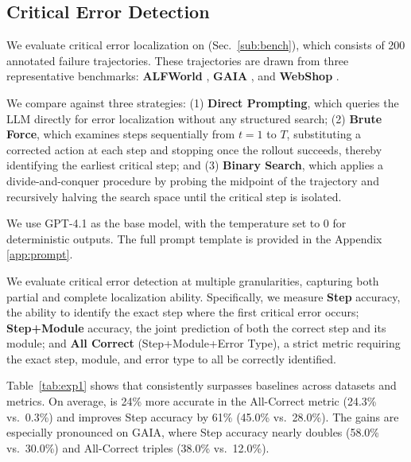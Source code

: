 \subsection{Critical Error Detection}
\label{subsec:rootcause}

We evaluate critical error localization on \Bench{} (Sec.~\ref{sub:bench}), which consists of 200 annotated failure trajectories.  
These trajectories are drawn from three representative benchmarks: \textbf{ALFWorld} \citep{shridhar2020alfworld}, \textbf{GAIA} \citep{mialon2023gaia}, and \textbf{WebShop} \citep{yao2022webshop}.  

We compare against three strategies: (1) \textbf{Direct Prompting}, which queries the LLM directly for error localization without any structured search; (2) \textbf{Brute Force}, which examines steps sequentially from $t{=}1$ to $T$, substituting a corrected action at each step and stopping once the rollout succeeds, thereby identifying the earliest critical step; and (3) \textbf{Binary Search}, which applies a divide-and-conquer procedure by probing the midpoint of the trajectory and recursively halving the search space until the critical step is isolated.  

We use GPT-4.1 as the base model, with the temperature set to 0 for deterministic outputs. The full prompt template is provided in the Appendix \ref{app:prompt}. 

 We evaluate critical error detection at multiple granularities, capturing both partial and complete localization ability. Specifically, we measure \textbf{Step} accuracy, the ability to identify the exact step where the first critical error occurs; %
\textbf{Step+Module} accuracy, the joint prediction of both the correct step and its module; and \textbf{All Correct} (Step+Module+Error Type), a strict metric requiring the exact step, module, and error type to all be correctly identified.


Table~\ref{tab:exp1} shows that \ModelName{} consistently surpasses baselines across datasets and metrics. On average, \ModelName{} is 24\% more accurate in the All-Correct metric (24.3\% vs.\ 0.3\%) and improves Step accuracy by 61\% (45.0\% vs.\ 28.0\%). The gains are especially pronounced on GAIA, where Step accuracy nearly doubles (58.0\% vs.\ 30.0\%) and All-Correct triples (38.0\% vs.\ 12.0\%).

